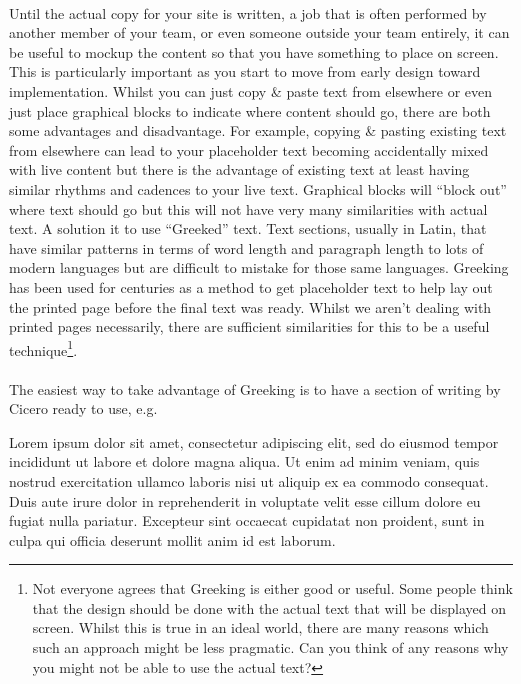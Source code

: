 \documentclass[10pt, a4paper, twosize]{article}
\begin{document}
\paragraph{} Until the actual copy for your site is written, a job that is often performed by another member of your team, or even someone outside your team entirely, it can be useful to mockup the content so that you have something to place on screen. This is particularly important as you start to move from early design toward implementation. Whilst you can just copy \& paste text from elsewhere or even just place graphical blocks to indicate where content should go, there are both some advantages and disadvantage. For example, copying \& pasting existing text from elsewhere can lead to your placeholder text becoming accidentally mixed with live content but there is the advantage of existing text at least having similar rhythms and cadences to your live text. Graphical blocks will ``block out'' where text should go but this will not have very many similarities with actual text. A solution it to use ``Greeked'' text. Text sections, usually in Latin, that have similar patterns in terms of word length and paragraph length to lots of modern languages but are difficult to mistake for those same languages. Greeking has been used for centuries as a method to get placeholder text to help lay out the printed page before the final text was ready. Whilst we aren't dealing with printed pages necessarily, there are sufficient similarities for this to be a useful technique\footnote{Not everyone agrees that Greeking is either good or useful. Some people think that the design should be done with the actual text that will be displayed on screen. Whilst this is true in an ideal world, there are many reasons which such an approach might be less pragmatic. Can you think of any reasons why you might not be able to use the actual text?}.

\paragraph{} The easiest way to take advantage of Greeking is to have a section of writing by Cicero ready to use, e.g. 

\begin{framed}
Lorem ipsum dolor sit amet, consectetur adipiscing elit, sed do eiusmod tempor incididunt ut labore et dolore magna aliqua. Ut enim ad minim veniam, quis nostrud exercitation ullamco laboris nisi ut aliquip ex ea commodo consequat. Duis aute irure dolor in reprehenderit in voluptate velit esse cillum dolore eu fugiat nulla pariatur. Excepteur sint occaecat cupidatat non proident, sunt in culpa qui officia deserunt mollit anim id est laborum.
\end{framed}
\end{document}
